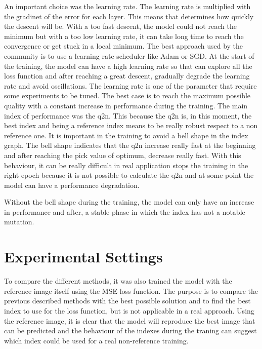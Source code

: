 \documentclass[12pt]{report}
\begin{document}
An important choice was the learning rate. The learning rate is multiplied with the gradinet of the error for each layer.
This means that determines how quickly the descent will be. With a too fast descent, the model could not reach the minimum
but with a too low learning rate, it can take long time to reach the convergence or get stuck in a local minimum.
The best approach used by the community is to use a learning rate scheduler like Adam or SGD.
At the start of the training, the model can have a high learning rate so that can explore all the loss function and after 
reaching a great descent, gradually degrade the learning rate and avoid oscillations.
The learning rate is one of the parameter that require some experiments to be tuned.
The best case is to reach the maximum possible quality with a constant increase in performance during the training.
The main index of performance was the q2n. This because the q2n is, in this moment, the best index and being a reference index means to be really robust respect to 
a non reference one. 
It is important in the training to avoid a bell shape in the index graph. The bell shape indicates that the q2n increase really fast at the beginning and
after reaching the pick value of optimum, decrease really fast. 
With this behaviour, it can be really difficult in real application stops the training in the right epoch because
it is not possible to calculate the q2n and at some point the model can have a performance degradation.

Without the bell shape during the training, the model can only have an increase in performance and after, a stable phase in which the index has not a notable mutation.


\section{Experimental Settings}
To compare the different methods, it was also trained the model with the reference image itself using the MSE loss function.
The purpose is to compare the previous described methods with the best possible solution and to find the best index to use for the loss function, but is not applicable in a real approach.
Using the reference image, it is clear that the model will reproduce the best image that can be predicted and the
behaviour of the indexes during the traning can suggest which index could be used for a real non-reference training.
\end{document}
